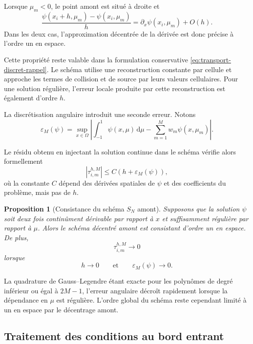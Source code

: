\documentclass{article}
\newtheorem{proposition}[theorem]{Proposition}
\begin{document}
Lorsque $\mu_m<0$, le point amont est situé à droite et
\[
    \frac{\psi(x_i+h,\mu_m)-\psi(x_i,\mu_m)}{h}
    = \partial_x\psi(x_i,\mu_m)+O(h).
\]
Dans les deux cas, l'approximation décentrée de la dérivée est donc précise à l'ordre un en espace.

Cette propriété reste valable dans la formulation conservative \eqref{eq:transport-discret-rappel}. Le schéma utilise une reconstruction constante par cellule et approche les termes de collision et de source par leurs valeurs cellulaires. Pour une solution régulière, l'erreur locale produite par cette reconstruction est également d'ordre $h$.

La discrétisation angulaire introduit une seconde erreur. Notons
\begin{equation}
    \varepsilon_M(\psi) = \sup_{x\in\Omega}
    \left|
        \int_{-1}^{1}\psi(x,\mu)\,\mathrm{d}\mu - \sum_{m=1}^{M}w_m\psi(x,\mu_m)
    \right|.
    \label{eq:erreur-quadrature-transport}
\end{equation}

Le résidu obtenu en injectant la solution continue dans le schéma vérifie alors formellement
\begin{equation}
    \left| \tau_{i,m}^{h,M} \right|
    \leq C (h+\varepsilon_M(\psi)),
    \label{eq:erreur-consistance-transport}
\end{equation}
où la constante $C$ dépend des dérivées spatiales de $\psi$ et des
coefficients du problème, mais pas de $h$.

\begin{proposition}[Consistance du schéma $S_N$ amont]
    Supposons que la solution $\psi$ soit deux fois continûment dérivable par rapport à $x$ et suffisamment régulière par rapport à $\mu$. Alors le schéma décentré amont est consistant d'ordre un en espace. De plus,
    \[
        \tau_{i,m}^{h,M} \longrightarrow0
    \]
    lorsque
    \[
        h\longrightarrow0 \qquad\text{et}\qquad \varepsilon_M(\psi)\longrightarrow0.
    \]
\end{proposition}

La quadrature de Gauss--Legendre étant exacte pour les polynômes de degré inférieur ou égal à $2M-1$, l'erreur angulaire décroît rapidement lorsque la dépendance en $\mu$ est régulière. L'ordre global du schéma reste cependant limité à un en espace par le décentrage amont.

\subsection {Traitement des conditions au bord entrant}
\end{document}
